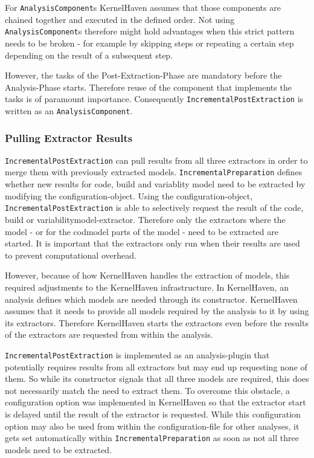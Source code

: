 \documentclass[a4paper]{article}
\begin{document}
For \texttt{Analysis\-Component}s KernelHaven assumes that those components are chained together and executed in the defined order. Not using \texttt{Analysis\-Component}s therefore might hold advantages when this strict pattern needs to be broken - for example by skipping steps or repeating a certain step depending on the result of a subsequent step.

However, the tasks of the Post-Extraction-Phase are mandatory before the Analysis-Phase starts. Therefore reuse of the component that implements the tasks is of paramount importance. Consequently \texttt{Incremental\-Post\-Extraction} is written as an \texttt{Analysis\-Component}.

\subsubsection{Pulling Extractor Results}

\texttt{Incremental\-Post\-Extraction} can pull results from all three extractors in order to merge them with previously extracted models. \texttt{Incremental\-Preparation} defines whether new results for code, build and variablity model need to be extracted by modifying the configuration-object. Using the configuration-object, \texttt{Incremental\-Post\-Extraction} is able to selectively request the result of the code, build or variabilitymodel-extractor. Therefore only the extractors where the model - or for the codmodel parts of the model - need to be extracted are started. It is important that the extractors only run when their results are used to prevent computational overhead.

However, because of how KernelHaven handles the extraction of models, this required adjustments to the KernelHaven infrastructure. In KernelHaven, an analysis defines which models are needed through its constructor. KernelHaven assumes that it needs to provide all models required by the analysis to it by using its extractors. Therefore KernelHaven starts the extractors even before the results of the extractors are requested from within the analysis. 

\texttt{Incremental\-Post\-Extraction} is implemented as an analysis-plugin that potentially requires results from all extractors but may end up requesting none of them. So while its constructor signals that all three models are required, this does not necessarily match the need to extract them. To overcome this obstacle, a configuration option was implemented in KernelHaven so that the extractor start is delayed until the result of the extractor is requested. While this configuration option may also be used from within the configuration-file for other analyses, it gets set automatically within \texttt{Incremental\-Preparation} as soon as not all three models need to be extracted.
\end{document}
